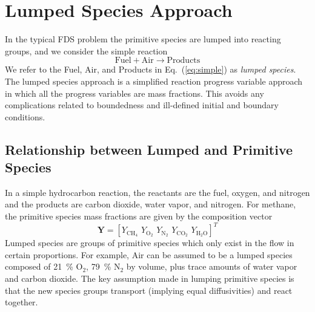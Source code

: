 \section{Lumped Species Approach}
\label{sec:lumpedspecies}

In the typical FDS problem the primitive species are lumped into reacting groups, and we consider the simple reaction
\begin{equation}\label{eq:simple}
\mathrm{Fuel + Air \rightarrow Products}
\end{equation}
We refer to the Fuel, Air, and Products in Eq.~(\ref{eq:simple}) as \emph{lumped species}.  The lumped species approach is a simplified reaction progress variable approach~\cite{fox2003} in which all the progress variables are mass fractions. This avoids any complications related to boundedness and ill-defined initial and boundary conditions.

\subsection{Relationship between Lumped and Primitive Species}

In a simple hydrocarbon reaction, the reactants are the fuel, oxygen, and nitrogen and the products are carbon dioxide, water vapor, and nitrogen. For methane, the primitive species mass fractions are given by the composition vector
\begin{equation}\label{eq:prim_vector}
\mathbf{Y} = [Y_{\mathrm{CH}_4}\, \, Y_{\mathrm{O}_2}\, \, Y_{\mathrm{N}_2}\, \, Y_{\mathrm{CO}_2}\, \, Y_{\mathrm{H}_2\mathrm{O}}]^T
\end{equation}
Lumped species are groups of primitive species which only exist in the flow in certain proportions. For example, Air can be assumed to be a lumped species composed of 21~\% O$_2$, 79~\% N$_2$ by volume, plus trace amounts of water vapor and carbon dioxide. The key assumption made in lumping primitive species is that the new species groups transport (implying equal diffusivities) and react together.


